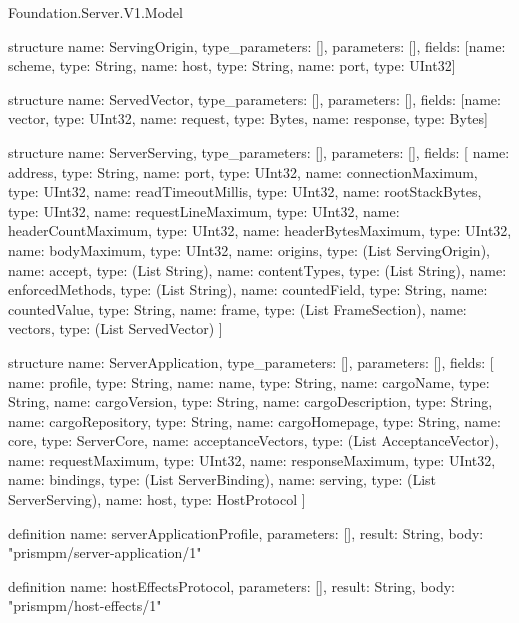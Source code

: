 \begin{lexlean}{Foundation.Server.V1.Model}
\begin{semanticmodule}
structure{
  name: ServingOrigin,
  type_parameters: [],
  parameters: [],
  fields: [{name: scheme, type: String}, {name: host, type: String}, {name: port, type: UInt32}]
}

structure{
  name: ServedVector,
  type_parameters: [],
  parameters: [],
  fields: [{name: vector, type: UInt32}, {name: request, type: Bytes}, {name: response, type: Bytes}]
}

structure{
  name: ServerServing,
  type_parameters: [],
  parameters: [],
  fields: [
    {name: address, type: String},
    {name: port, type: UInt32},
    {name: connectionMaximum, type: UInt32},
    {name: readTimeoutMillis, type: UInt32},
    {name: rootStackBytes, type: UInt32},
    {name: requestLineMaximum, type: UInt32},
    {name: headerCountMaximum, type: UInt32},
    {name: headerBytesMaximum, type: UInt32},
    {name: bodyMaximum, type: UInt32},
    {name: origins, type: (List ServingOrigin)},
    {name: accept, type: (List String)},
    {name: contentTypes, type: (List String)},
    {name: enforcedMethods, type: (List String)},
    {name: countedField, type: String},
    {name: countedValue, type: String},
    {name: frame, type: (List FrameSection)},
    {name: vectors, type: (List ServedVector)}
  ]
}

structure{
  name: ServerApplication,
  type_parameters: [],
  parameters: [],
  fields: [
    {name: profile, type: String},
    {name: name, type: String},
    {name: cargoName, type: String},
    {name: cargoVersion, type: String},
    {name: cargoDescription, type: String},
    {name: cargoRepository, type: String},
    {name: cargoHomepage, type: String},
    {name: core, type: ServerCore},
    {name: acceptanceVectors, type: (List AcceptanceVector)},
    {name: requestMaximum, type: UInt32},
    {name: responseMaximum, type: UInt32},
    {name: bindings, type: (List ServerBinding)},
    {name: serving, type: (List ServerServing)},
    {name: host, type: HostProtocol}
  ]
}

definition{
  name: serverApplicationProfile,
  parameters: [],
  result: String,
  body: "prismpm/server-application/1"
}

definition{
  name: hostEffectsProtocol,
  parameters: [],
  result: String,
  body: "prismpm/host-effects/1"
}
\end{semanticmodule}
\end{lexlean}

